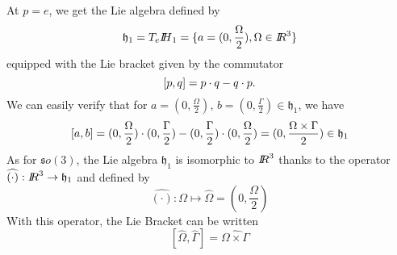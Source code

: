 At $p=e$, we get the Lie algebra defined by
\begin{equation}
  \label{eq:134}
  \mathfrak h_1 =  T_e{\mbox{\rm $I\!\!H$}_1} =  \{ a = (0, \frac \Omega 2 ), \Omega \in \mbox{\rm $I\!\!R$}^3 \}
\end{equation}
equipped with the Lie bracket given by the commutator
\begin{equation}
  \label{eq:135}
  [p,q] = p \cdot q- q\cdot p.
\end{equation}
We can easily verify that for $a = (0, \frac \Omega 2 ), \, b = (0, \frac \Gamma 2 ) \in \mathfrak h_1 $, we have
\begin{equation}
  \label{eq:136}
  [a,b] = (0, \frac \Omega 2 ) \cdot (0, \frac \Gamma 2 ) - (0, \frac \Gamma 2 ) \cdot  (0, \frac \Omega 2 )  = (0, \frac{\Omega\times \Gamma}{2}) \in \mathfrak h_1
\end{equation}
As for $\mathfrak so(3)$,  the Lie algebra $\mathfrak h_1$ is isomorphic to $\mbox{\rm $I\!\!R$}^3$ thanks to the operator $\widehat{(\cdot)} :\mbox{\rm $I\!\!R$}^3 \rightarrow \mathfrak h_1$ and defined by
\begin{equation}
  \label{eq:54}
 \widehat{(\cdot)}: \Omega \mapsto \widehat \Omega = (0, \frac \Omega 2 ) 
\end{equation}
With this operator, the Lie Bracket can be written
\begin{equation}
  \label{eq:137}
  [\widehat{\Omega},\widehat{\Gamma}] = \widehat{\Omega \times \Gamma} 
\end{equation}


